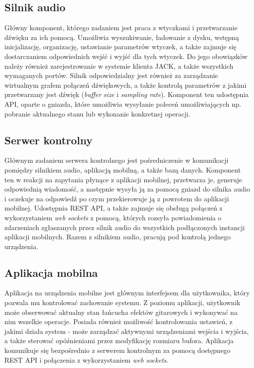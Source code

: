 \documentclass[12pt,a4paper]{report}
\begin{document}
\subsection{Silnik audio}
Główny komponent, którego zadaniem jest praca z wtyczkami i
przetwarzanie dźwięku za ich pomocą. Umożliwia wyszukiwanie,
ładowanie z dysku, wstępną inicjalizację, organizację, ustawianie
parametrów wtyczek, a także zajmuje się dostarczaniem odpowiednich
wejść i wyjść dla tych wtyczek. Do jego obowiązków należy również
zarejestrowanie w systemie klienta JACK, a także wszystkich
wymaganych portów. Silnik odpowiedzialny jest również za zarządzanie
wirtualnym grafem połączeń dźwiękowych, a także kontrolą parametrów z
jakimi przetwarzany jest dźwięk (\textit{buffer size} i
\textit{sampling rate}). Komponent ten udostępnia API, oparte o
gniazda, które umożliwia wysyłanie poleceń umożliwiających np.
pobranie aktualnego stanu lub wykonanie konkretnej operacji.

\subsection{Serwer kontrolny}
Głównym zadaniem serwera kontrolnego jest pośredniczenie w
komunikacji pomiędzy silnikiem audio, aplikacją mobilną, a także bazą
danych. Komponent ten w reakcji na zapytania płynące z aplikacji
mobilnej, przetwarza je, generuje odpowiednią wiadomość, a następnie
wysyła ją za pomocą gniazd do silnika audio i oczekuje na odpowiedź
po czym przekierowuje ją z powrotem do aplikacji mobilnej.
Udostępnia REST API, a także zajmuje się obsługą połączeń z
wykorzystaniem \textit{web sockets} z pomocą, których rozsyła
powiadomienia o zdarzeniach zgłaszanych przez silnik audio do
wszystkich podłączonych instancji aplikacji mobilnych. Razem z
silnikiem audio, pracują pod kontrolą jednego urządzenia.

\subsection{Aplikacja mobilna}
Aplikacja na urządzenia mobilne jest głównym interfejsem dla
użytkownika, który pozwala mu kontrolować zachowanie systemu. Z
poziomu aplikacji, użytkownik może obserwować aktualny stan łańcucha
efektów gitarowych i wykonywać na nim wszelkie operacje. Posiada
również możliwość kontrolowania ustawień, z jakimi działa system -
może zarządzać aktywnymi urządzeniami wejścia i wyjścia, a także
sterować opóźnieniami przez modyfikację rozmiaru bufora. Aplikacja
komunikuje się bezpośrednio z serwerem kontrolnym za pomocą
dostępnego REST API i połączenia z wykorzystaniem \textit{web sockets}.
\end{document}
